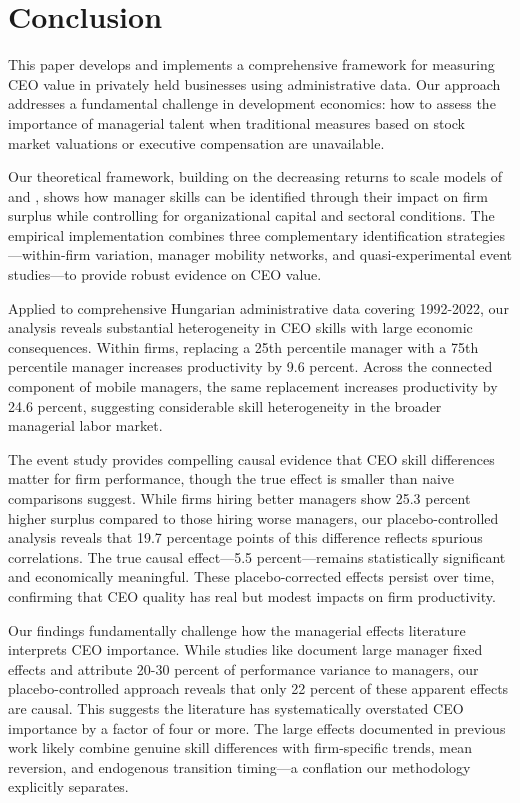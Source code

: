 \documentclass[11pt,a4paper]{article}
\begin{document}
\section{Conclusion}

This paper develops and implements a comprehensive framework for measuring CEO value in privately held businesses using administrative data. Our approach addresses a fundamental challenge in development economics: how to assess the importance of managerial talent when traditional measures based on stock market valuations or executive compensation are unavailable.

Our theoretical framework, building on the decreasing returns to scale models of \citet{AtkesonKehoe2005JPE} and \citet{McGrattan2012RED}, shows how manager skills can be identified through their impact on firm surplus while controlling for organizational capital and sectoral conditions. The empirical implementation combines three complementary identification strategies---within-firm variation, manager mobility networks, and quasi-experimental event studies---to provide robust evidence on CEO value.

Applied to comprehensive Hungarian administrative data covering 1992-2022, our analysis reveals substantial heterogeneity in CEO skills with large economic consequences. Within firms, replacing a 25th percentile manager with a 75th percentile manager increases productivity by 9.6 percent. Across the connected component of mobile managers, the same replacement increases productivity by 24.6 percent, suggesting considerable skill heterogeneity in the broader managerial labor market.

The event study provides compelling causal evidence that CEO skill differences matter for firm performance, though the true effect is smaller than naive comparisons suggest. While firms hiring better managers show 25.3 percent higher surplus compared to those hiring worse managers, our placebo-controlled analysis reveals that 19.7 percentage points of this difference reflects spurious correlations. The true causal effect---5.5 percent---remains statistically significant and economically meaningful. These placebo-corrected effects persist over time, confirming that CEO quality has real but modest impacts on firm productivity.

Our findings fundamentally challenge how the managerial effects literature interprets CEO importance. While studies like \citet{Bertrand2003-io} document large manager fixed effects and \citet{metcalfe2023managers} attribute 20-30 percent of performance variance to managers, our placebo-controlled approach reveals that only 22 percent of these apparent effects are causal. This suggests the literature has systematically overstated CEO importance by a factor of four or more. The large effects documented in previous work likely combine genuine skill differences with firm-specific trends, mean reversion, and endogenous transition timing---a conflation our methodology explicitly separates.
\end{document}
